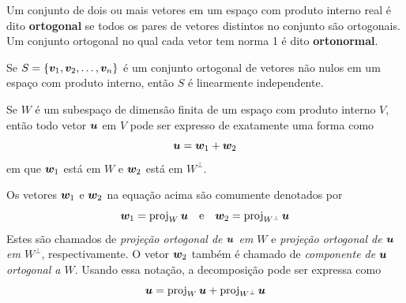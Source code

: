 \begin{definition}
	Um conjunto de dois ou mais vetores em um espaço com produto interno real é dito \textbf{ortogonal} se todos os pares de vetores distintos no conjunto são ortogonais. Um conjunto ortogonal no qual cada vetor tem norma 1 é dito \textbf{ortonormal}.
\end{definition}

\begin{theorem}
	Se $S = \{\bm{v}_1,\bm{v}_2,\ldots,\bm{v}_n\}$ é um conjunto ortogonal de vetores não nulos em um espaço com produto interno, então $S$ é linearmente independente.
\end{theorem}


\begin{theorem}
	Se $W$ é um subespaço de dimensão finita de um espaço com produto interno $V$, então todo vetor $\bm{u}$ em $V$ pode ser expresso de exatamente uma forma como
	\begin{equation}
		\bm{u} = \bm{w}_1 + \bm{w}_2
	\end{equation}
	em que $\bm{w}_1$ está em $W$ e $\bm{w}_2$ está em $W^{\perp}$.
	\begin{note}
		\leavevmode
		\begin{outline}[enumerate]
			\1 Os vetores $\bm{w}_1$ e $\bm{w}_2$ na equação acima são comumente denotados por
			\begin{equation}
				\bm{w}_1 = \operatorname{proj}_W \bm{u} \quad \text{e} \quad \bm{w}_2 = \operatorname{proj}_{W^{\perp}} \bm{u}
			\end{equation}
			Estes são chamados de \textit{projeção ortogonal de $\bm{u}$ em $W$} e \textit{projeção ortogonal de $\bm{u}$ em $W^{\perp}$}, respectivamente. O vetor $\bm{w}_2$ também é chamado de \textit{componente de $\bm{u}$ ortogonal a $W$}. Usando essa notação, a decomposição pode ser expressa como
			\begin{equation}
				\bm{u} = \operatorname{proj}_W \bm{u} + \operatorname{proj}_{W^{\perp}} \bm{u}
			\end{equation}
		\end{outline}
	\end{note}
\end{theorem}

